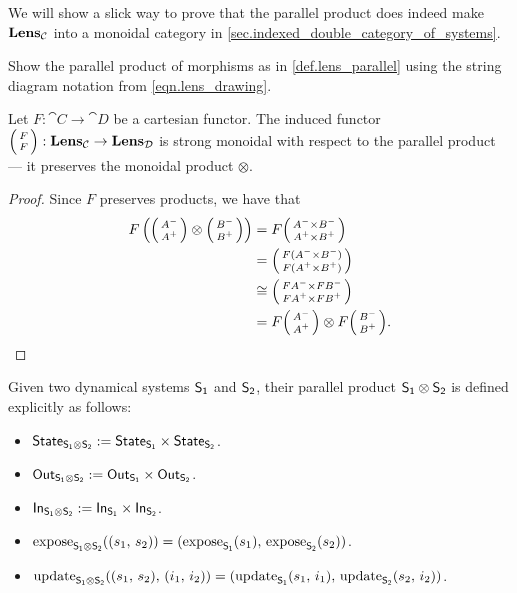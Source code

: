 \documentclass[DynamicalBook]{subfiles}
\begin{document}
\begin{remark}
  We will show a slick way to prove that the parallel product does indeed make
  $\textbf{Lens}_{\mathcal{C}}$ into a monoidal category in \cref{sec.indexed_double_category_of_systems}.
\end{remark}

\begin{exercise}
Show the parallel product of morphisms as in \cref{def.lens_parallel} using the string diagram notation from \eqref{eqn.lens_drawing}.
\end{exercise}


\begin{proposition}\label{prop.lens_functoriality_monoidal}
Let $F : \cat{C} \to \cat{D}$ be a cartesian functor. The induced functor
$\lens{F}{F} : \Cat{Lens}_{\cat{C}} \to \Cat{Lens}_{\cat{D}}$ is strong monoidal
with respect to the parallel product --- it preserves the monoidal product $\otimes$.
\end{proposition}
\begin{proof}
  Since $F$ preserves products, we have that
  \begin{align*}
    F\left(\lens{A^{-}}{A^{+}}\otimes \lens{B^{-}}{B^{+}}\right) &= F\lens{A^{-} \times B^{-}}{A^{+} \times B^{+}} \\
                                                                 &= \lens{F(A^{-} \times B^{-})}{F(A^{+} \times B^{+})} \\
                                                                 &\cong  \lens{FA^{-} \times FB^{-}}{FA^{+} \times FB^{+}} \\
    &= F\lens{A^{-}}{A^{+}} \otimes F\lens{B^{-}}{B^{+}}.
    \end{align*}
\end{proof}

Given two dynamical systems $\mathsf{S_1}$ and $\mathsf{S_2}$, their parallel product
$\mathsf{S_1} \otimes \mathsf{S_2}$ is defined explicitly as follows:
\begin{itemize}
\item $\mathsf{State}_{\mathsf{S_1 \otimes S_2}} := \mathsf{State}_{\mathsf{S_1}} \times \mathsf{State}_{\mathsf{S_2}}$.
\item $\mathsf{Out}_{\mathsf{S_1 \otimes S_2}} := \mathsf{Out}_{\mathsf{S_1}} \times \mathsf{Out}_{\mathsf{S_2}}$.
\item $\mathsf{In}_{\mathsf{S_1 \otimes S_2}} := \mathsf{In}_{\mathsf{S_1}} \times \mathsf{In}_{\mathsf{S_2}}$.
\item $\mathrm{expose}_{\mathsf{S_1 \otimes S_2}}((s_1,\, s_2)) = (\mathrm{expose}_{\mathsf{S_1}}(s_1),\, \mathrm{expose}_{\mathsf{S_2}}(s_2))$.
\item $\mathrm{update}_{\mathsf{S_1 \otimes S_2}}((s_1,\, s_2),\, (i_1,\, i_2)) =
  (\mathrm{update}_{\mathsf{S_1}}(s_1,\, i_1),\, \mathrm{update}_{\mathsf{S_2}}(s_2,\, i_2))$.
\end{itemize}
\end{document}
